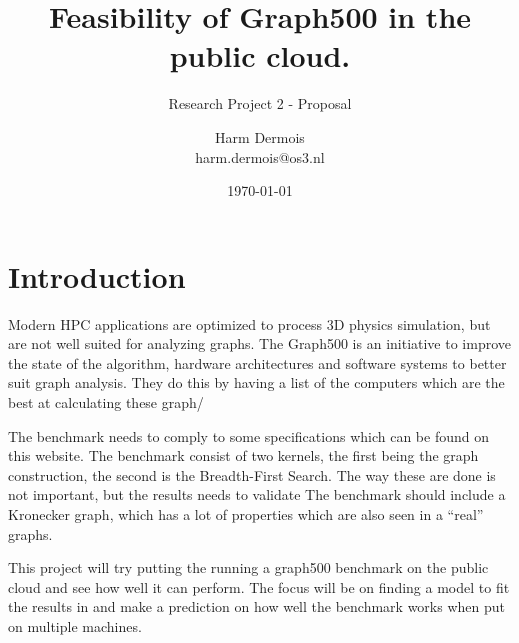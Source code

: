 \documentclass[A4]{scrartcl}
\begin{document}
\title{Feasibility of Graph500 in the public cloud.}
\subtitle{Research Project 2 - Proposal}
\date{\today}
\author{Harm Dermois \\ harm.dermois@os3.nl}

\maketitle

\section*{Introduction}
\label{sec:introduction}
Modern HPC applications are optimized to process 3D physics simulation, but are not well suited for analyzing graphs. The Graph500 \cite{murphy2010introducing} is an initiative to improve the state of the algorithm, hardware architectures and software systems to better suit graph analysis. They do this by having a list of the computers which are the best at calculating these graph/

The benchmark needs to comply to some specifications which can be found on this website. The benchmark consist of two kernels, the first being the graph construction, the second is the Breadth-First Search. The way these are done is not important, but the results needs to validate 
The benchmark should include a Kronecker graph, which has a lot of properties which are also seen in a ``real'' graphs.

This project will try putting the running a graph500 benchmark on the public cloud and see how well it can perform. The focus will be on finding a model to fit the results in and make a prediction on how well the benchmark works when put on multiple machines.    



\end{document}
